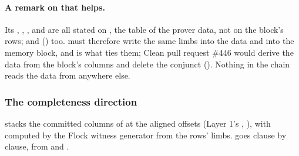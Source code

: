 \paragraph{A remark on \texorpdfstring{\protect{}}{SatisfiedBy} that helps.}
Its , , ,  and
 are all stated on , the  table of the prover
data, not on the block's rows; and  () too.
 must therefore write the same limbs into the data and into the memory block,
and  is what ties them; Clean pull request \#446 would derive the data from the
block's columns and delete the conjunct (). Nothing in the chain
reads the data from anywhere else.

\subsubsection{The completeness direction}\label{sec:gen-boundary-completeness}

 stacks the committed columns of  at the aligned
offsets (Layer 1's , ), with  computed
by the Flock witness generator from the  rows' limbs. 
goes clause by clause, from  and
.


